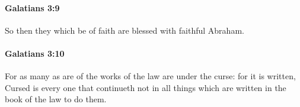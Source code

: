 		\paragraph{Galatians 3:9} %
			\label{GALATIANS-3-9}

			So then they which be of faith are blessed with faithful Abraham.

			\begin{framed}
			\scriptsize
				\begin{compactdesc}
					\item[SBLG] 
				\end{compactdesc}
			\end{framed}

		\paragraph{Galatians 3:10} %
			\label{GALATIANS-3-10}

			For as many as are of the works of the law are under the curse: for it is written, Cursed is every one that continueth not in all things which are written in the book of the law to do them.

